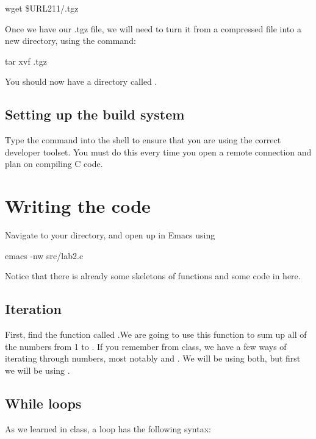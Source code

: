 \documentclass{tufte-handout}
\begin{document}
\begin{CmdLine}
  \prompt wget \$URL211/\ThisLabBase.tgz
\end{CmdLine}

Once we have our .tgz file, we will need to turn it from a compressed
file into a new directory, using the  command:

\begin{CmdLine}
  \prompt tar xvf \ThisLabBase.tgz
\end{CmdLine}

You should now have a directory called \filename{\ThisLabBase}.

\subsection{Setting up the build system}
Type the  command into the shell to ensure that you are
using the correct developer toolset. You must do this every time you
open a remote connection and plan on compiling C code.

\section{Writing the code}
Navigate to your \filename{\LabBaseUrl} directory, and open up
 in Emacs using 
\begin{CmdLine}
  \prompt emacs -nw src/lab2.c
\end{CmdLine}
Notice that there is already some skeletons of functions and some code in  here.

\subsection{Iteration}
First, find the function called .We are going to use this function to sum up all of the numbers from 1 to .  If you remember from class, we have a few ways of iterating through numbers, most notably  and .  We will be using both, but first we will be using .

\subsection{While loops}
As we learned in class, a   loop has the following
syntax:
\end{document}
